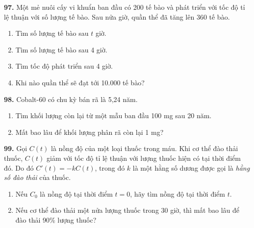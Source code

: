 \begin{minipage}[t]{0.485\textwidth}
\medskip
\textbf{97.} Một mẻ nuôi cấy vi khuẩn ban đầu có 200 tế bào và phát triển với tốc độ tỉ lệ thuận với số lượng tế bào. Sau nửa giờ, quần thể đã tăng lên 360 tế bào.
\begin{enumerate}[label=(\alph*), leftmargin=1.8em, itemsep=1.5pt, topsep=2pt]
    \item Tìm số lượng tế bào sau $t$ giờ.
    \item Tìm số lượng tế bào sau 4 giờ.
    \item Tìm tốc độ phát triển sau 4 giờ.
    \item Khi nào quần thể sẽ đạt tới 10.000 tế bào?
\end{enumerate}

\medskip
\textbf{98.} Cobalt-60 có chu kỳ bán rã là 5,24 năm.
\begin{enumerate}[label=(\alph*), leftmargin=1.8em, itemsep=1.5pt, topsep=2pt]
    \item Tìm khối lượng còn lại từ một mẫu ban đầu 100 mg sau 20 năm.
    \item Mất bao lâu để khối lượng phân rã còn lại 1 mg?
\end{enumerate}

\medskip
\textbf{99.} Gọi $C(t)$ là nồng độ của một loại thuốc trong máu. Khi cơ thể đào thải thuốc, $C(t)$ giảm với tốc độ tỉ lệ thuận với lượng thuốc hiện có tại thời điểm đó. Do đó $C'(t) = -kC(t)$, trong đó $k$ là một hằng số dương được gọi là \textit{hằng số đào thải} của thuốc.
\begin{enumerate}[label=(\alph*), leftmargin=1.8em, itemsep=1.5pt, topsep=2pt]
    \item Nếu $C_0$ là nồng độ tại thời điểm $t = 0$, hãy tìm nồng độ tại thời điểm $t$.
    \item Nếu cơ thể đào thải một nửa lượng thuốc trong 30 giờ, thì mất bao lâu để đào thải 90\% lượng thuốc?
\end{enumerate}
\end{minipage}%
\hfill

